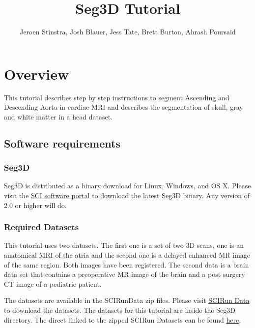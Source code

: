 \documentclass[fleqn,11pt,openany]{book}
\title{Seg3D Tutorial}
\author{Jeroen Stinstra, Josh Blauer, Jess Tate, Brett Burton, Ahrash Poursaid}
\begin{document}


\maketitle


\chapter{Overview}

\begin{introduction}

This tutorial describes step by step instructions to segment Ascending and Descending Aorta in cardiac MRI and describes the segmentation of skull, gray and white matter in a head dataset. 

\end{introduction}

\section{Software requirements}
\label{sec:softwarerequirements}
\subsection{Seg3D \SegthreeDVersion}

Seg3D is distributed as a binary download for Linux, Windows, and OS X. Please visit the \href{http://software.sci.utah.edu}{SCI software portal} to download the latest Seg3D binary. Any version of 2.0 or higher will do. 

\subsection{Required Datasets}

This tutorial uses two datasets. The first one is a set  of two 3D scans, one is an anatomical MRI of the atria and the second one is a delayed enhanced MR image of the same region. Both images have been registered. The second data is a brain data set that contains a preoperative MR image of the brain and a post surgery CT image of a pediatric patient.

The datasets are available in the SCIRunData zip files. Please visit \href{http://www.scirun.org}{SCIRun Data} to download the datasets. The datasets for this tutorial are inside the Seg3D directory. The direct linked to the zipped SCIRun Datasets can be found \href{http://www.sci.utah.edu/releases/scirun_v4.6/SCIRunData_4.6_20120809_data.zip}{here}.
\end{document}
